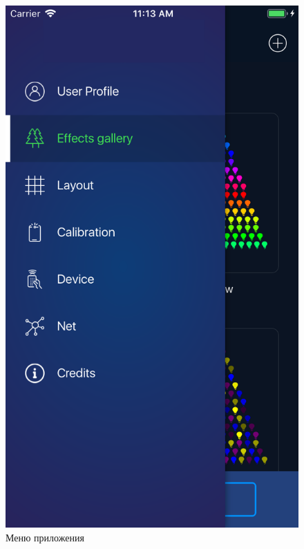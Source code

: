 \begin{figure}[H]
\centering
	\includegraphics[scale=0.2]{figures/userGuide/sideMenu.png}
	\caption{Меню приложения}
	\label{fig:develop:userGuide:sideMenu}
\end{figure}


